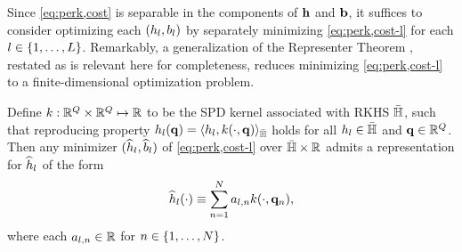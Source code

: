 Since \eqref{eq:perk,cost} is separable 
in the components of $\mathbf{h}$ and $\mathbf{b}$, 
it suffices to consider optimizing each $\paren{h_l,b_l}$ 
by separately minimizing \eqref{eq:perk,cost-l} 
for each $l \in \set{1,\dots,L}$.
Remarkably,
a generalization of the Representer Theorem \cite{scholkopf:01:agr},
restated as is relevant here for completeness,
reduces minimizing \eqref{eq:perk,cost-l} 
to a finite-dimensional optimization problem.
\begin{thm}
	Define $k : \mathbb{R}^{Q} \times \mathbb{R}^{Q} \mapsto \mathbb{R}$
	to be the SPD kernel 
	associated with RKHS ${\bar{\mathbb{H}}}$, 
	such that reproducing property $h_l(\mathbf{q}) = \langle h_l,k(\cdot,\mathbf{q}) \rangle_{\bar{\mathbb{H}}}$
	holds for all $h_l \in {\bar{\mathbb{H}}}$ and $\mathbf{q} \in \mathbb{R}^{Q}$. 
	Then any minimizer $(\widehat{h}_l,\widehat{b}_l)$ of \eqref{eq:perk,cost-l}
	over ${\bar{\mathbb{H}}} \times \mathbb{R}$
	admits a representation for $\widehat{h}_l$ of the form
	\label{thm:perk,rep}
	\begin{align}
		\widehat{h}_l(\cdot) \equiv \sum_{n=1}^N a_{l,n} k(\cdot,\mathbf{q}_{n}),
		\label{eq:perk,rep}
	\end{align}
	where each $a_{l,n} \in \mathbb{R}$ for $n \in \set{1,\dots,N}$.
\end{thm}

